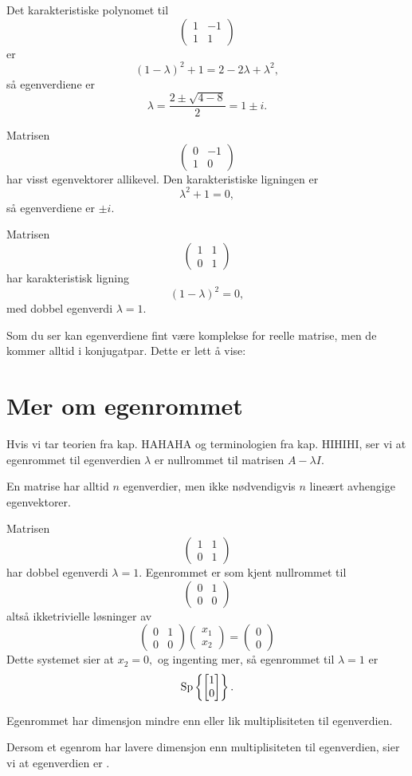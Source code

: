 \begin{ex}
Det karakteristiske polynomet til
\[
\begin{pmatrix}
1 & -1 \\ 1 &1
\end{pmatrix}
\]
er 
\[
(1-\lambda)^2+1=2-2\lambda+\lambda^2,
\]
så egenverdiene er 
\[
\lambda=\frac{2\pm\sqrt{4-8}}{2}=1\pm i.
\] 
\end{ex}

\begin{ex}
Matrisen
\[
\begin{pmatrix}
0 & -1 \\ 1 &0
\end{pmatrix}
\]
har visst egenvektorer allikevel. Den karakteristiske ligningen er 
\[
\lambda^2+1=0,
\]
så egenverdiene er $\pm i$. 
\end{ex}

\begin{ex}
Matrisen
\[
\begin{pmatrix}
1 & 1 \\ 0 &1
\end{pmatrix}
\]
har karakteristisk ligning
\[
(1-\lambda)^2=0,
\]
med dobbel egenverdi $\lambda=1$. 
\end{ex}

Som du ser kan egenverdiene fint være komplekse for reelle matrise, men de kommer alltid i konjugatpar. 
Dette er lett å vise: 

\section*{Mer om egenrommet}
Hvis vi tar teorien fra kap. HAHAHA og terminologien fra kap. HIHIHI, ser vi at egenrommet til egenverdien $\lambda$ er nullrommet til matrisen $A-\lambda I$.

En matrise har alltid $n$ egenverdier, men ikke nødvendigvis $n$ lineært avhengige egenvektorer.
\begin{ex}
Matrisen
\[
\begin{pmatrix}
1 & 1 \\ 0 &1
\end{pmatrix}
\]
har dobbel egenverdi $\lambda=1$. Egenrommet er som kjent nullrommet til 
\[
\begin{pmatrix}
0 & 1 \\ 0 &0
\end{pmatrix}
\]
altså ikketrivielle løsninger av 
\[
\begin{pmatrix}
0 & 1 \\ 0 &0
\end{pmatrix}
\begin{pmatrix}
x_1  \\ x_2
\end{pmatrix}
=
\begin{pmatrix}
0  \\ 0
\end{pmatrix}
\]
Dette systemet sier at
$
x_2=0,
$
og ingenting mer, så egenrommet til $\lambda=1$ er
\[
\operatorname{Sp} \left\{ \begin{bmatrix} 1 \\ 0 \end{bmatrix} \right\}.
\]
\end{ex}

\begin{thm}
Egenrommet har dimensjon mindre enn eller lik multiplisiteten til egenverdien.
\end{thm}

Dersom et egenrom har lavere dimensjon enn multiplisiteten til egenverdien, sier vi at egenverdien er .


\kapittelslutt

